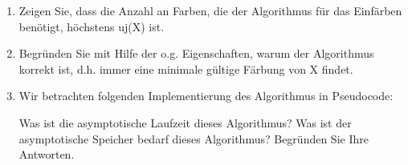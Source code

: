\documentclass{lehramt-informatik-aufgabe}
\begin{document}
\begin{enumerate}

\item Zeigen Sie, dass die Anzahl an Farben, die der Algorithmus für das
Einfärben benötigt, höchstens uj(X) ist.


\item Begründen Sie mit Hilfe der o.g. Eigenschaften, warum der
Algorithmus korrekt ist, d.h. immer eine minimale gültige Färbung von X
findet.


\item Wir betrachten folgenden Implementierung des Algorithmus in
Pseudocode:

















Was ist die asymptotische Laufzeit dieses Algorithmus? Was ist der
asymptotische Speicher bedarf dieses Algorithmus? Begründen Sie Ihre
Antworten.
\end{enumerate}
\end{document}
